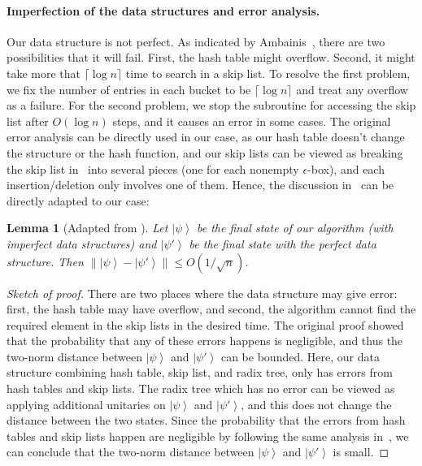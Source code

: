 \documentclass[10pt,a4paper]{article}
\newtheorem{lemma}[theorem]{Lemma}
\newcommand{\ket}[1]{\left| #1 \right\rangle}
\newcommand{\ceil}[1]{\lceil #1 \rceil}
\begin{document}
\paragraph{Imperfection of the data structures and error analysis.}
Our data structure is not perfect. As indicated by Ambainis~\cite{r5}, there are two possibilities that it will fail. First, the hash table might overflow. Second, it might take more that $\ceil{\log n}$ time to search in a skip list. To resolve the first problem, we fix the number of entries in each bucket to be $\ceil{\log n}$ and treat any overflow as a failure. For the second problem, we stop the subroutine for accessing the skip list after $O(\log n)$ steps, and it causes an error in some cases. The original error analysis can be directly used in our case, as our hash table doesn't change the structure or the hash function, and our skip lists can be viewed as breaking the skip list in~\cite{r5} into several pieces (one for each nonempty $\epsilon$-box), and each insertion/deletion only involves one of them. Hence, the discussion in~\cite[Section 6]{r5} can be directly adapted to our case: 
\begin{lemma}[Adapted from \cite{r5}]
  \label{lemma:dt-error}
  Let $\ket{\psi}$ be the final state of our algorithm (with imperfect data structures) and $\ket{\psi'}$ be the final state with the perfect data structure. Then $\|\ket{\psi} - \ket{\psi'}\| \leq O(1/\sqrt{n})$.
\end{lemma}
\begin{proof}[Sketch of proof]
There are two places where the data structure may give error: first, the hash table may have overflow, and second, the algorithm cannot find the required element in the skip lists in the desired time. The original proof showed that the probability that any of these errors happens is negligible, and thus the two-norm distance between $\ket{\psi}$ and $\ket{\psi'}$ can be bounded. Here, our data structure combining hash table, skip list, and radix tree, only has errors from hash tables and skip lists. The radix tree which has no error can be viewed as applying additional unitaries on $\ket{\psi}$ and $\ket{\psi'}$, and this does not change the distance between the two states. Since the probability that the errors from hash tables and skip lists happen are negligible by following the same analysis in~\cite{r5}, we can conclude that the two-norm distance between $\ket{\psi}$ and $\ket{\psi'}$ is small.  
\end{proof}
\end{document}
